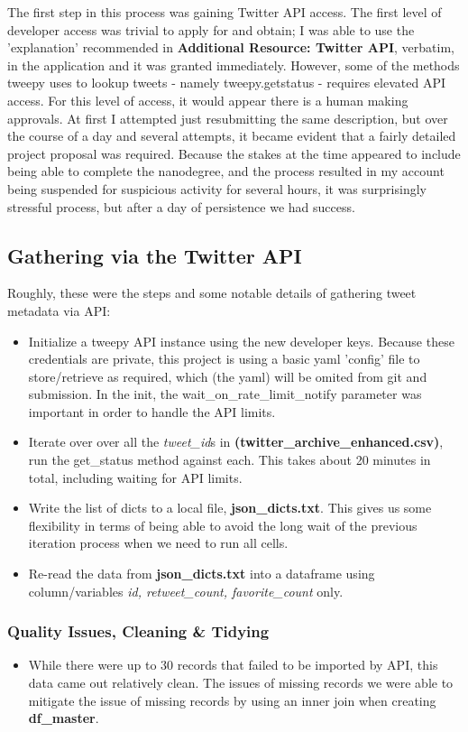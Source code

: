 \documentclass{report}
\begin{document}
The first step in this process was gaining Twitter API access. The first level of developer access was trivial to apply for and obtain; I was able to use the 'explanation' recommended 
in \textbf{Additional Resource: Twitter API}, verbatim, in the application and it was granted immediately. However, some of the methods tweepy uses to lookup tweets
 - namely tweepy.getstatus - requires elevated API access. For this level of access, it would appear there is a human making approvals. At first I attempted just resubmitting the same description,
but over the course of a day and several attempts, it became evident that a fairly detailed project proposal was required. Because the stakes at the time appeared to include being able to complete
the nanodegree, and the process resulted in my account being suspended for suspicious activity for several hours, it was surprisingly stressful process, but after a day of persistence we had success.

	\subsection{Gathering via the Twitter API}
	Roughly, these were the steps and some notable details of gathering tweet metadata via API:
		\begin{itemize}
			\item Initialize a tweepy API instance using the new developer keys. 
				\subitem Because these credentials are private, this project is using a basic yaml 'config' file to store/retrieve as required,
				which (the yaml) will be omited from git and submission.
				In the init, the wait\_on\_rate\_limit\_notify parameter was important in order to handle the API limits.
			\item Iterate over over all the \textit{tweet\_id}s in \textbf{(twitter\_archive\_enhanced.csv)}, run the get\_status method against each. This takes about 20 minutes in total, including
			waiting for API limits. 
			\item Write the list of dicts to a local file, \textbf{json\_dicts.txt}. This gives us some flexibility in terms of being able to avoid the long wait of the previous iteration process 
			when we need to run all cells.
			\item Re-read the data from  \textbf{json\_dicts.txt} into a dataframe using column/variables \textit{id, retweet\_count, favorite\_count} only.
		\end{itemize}
	\subsubsection{Quality Issues, Cleaning \& Tidying}
		\begin{itemize}
			\item While there were up to 30 records that failed to be imported by API, this data came out relatively clean. The issues of missing records we were able to mitigate the issue of missing records by using an 
			inner join when creating \textbf{df\_master}.

		\end{itemize} 
\end{document}
